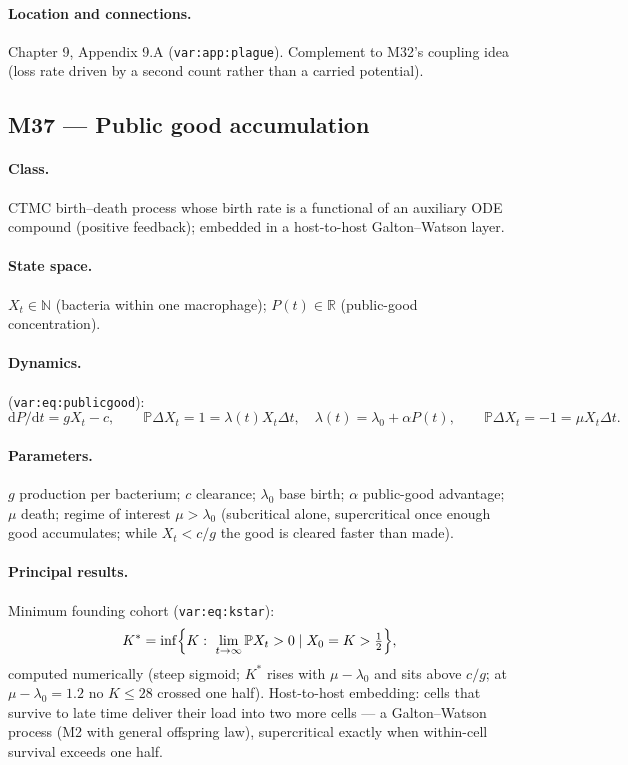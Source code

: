 \documentclass[11pt,a4paper]{article}
\newcommand{\PR}{\mathbb{P}}
\newcommand{\dd}{\mathrm{d}}
\begin{document}
\paragraph{Location and connections.} Chapter 9, Appendix 9.A
(\texttt{var:app:plague}). Complement to M32's coupling idea (loss rate
driven by a second count rather than a carried potential).

\subsection{M37 --- Public good accumulation}

\paragraph{Class.} CTMC birth--death process whose birth rate is a
functional of an auxiliary ODE compound (positive feedback); embedded in a
host-to-host Galton--Watson layer.

\paragraph{State space.} $X_t\in\mathbb N$ (bacteria within one
macrophage); $P(t)\in\mathbb R$ (public-good concentration).

\paragraph{Dynamics.} (\texttt{var:eq:publicgood}):
\[
\dd P/\dd t=gX_t-c,\qquad
\PR{\Delta X_t=1}=\lambda(t)X_t\Delta t,\quad
\lambda(t)=\lambda_0+\alpha P(t),\qquad
\PR{\Delta X_t=-1}=\mu X_t\Delta t .
\]

\paragraph{Parameters.} $g$ production per bacterium; $c$ clearance;
$\lambda_0$ base birth; $\alpha$ public-good advantage; $\mu$ death;
regime of interest $\mu>\lambda_0$ (subcritical alone, supercritical once
enough good accumulates; while $X_t<c/g$ the good is cleared faster than
made).

\paragraph{Principal results.} Minimum founding cohort
(\texttt{var:eq:kstar}):
\[
K^*=\inf\Bigl\{K:\ \lim_{t\to\infty}\PR{X_t>0\mid X_0=K}>\tfrac12\Bigr\},
\]
computed numerically (steep sigmoid; $K^*$ rises with $\mu-\lambda_0$ and
sits above $c/g$; at $\mu-\lambda_0=1.2$ no $K\le28$ crossed one half).
Host-to-host embedding: cells that survive to late time deliver their load
into two more cells --- a Galton--Watson process (M2 with general
offspring law), supercritical exactly when within-cell survival exceeds
one half.
\end{document}
